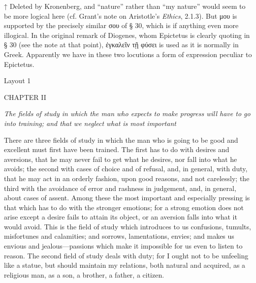 

↑ Deleted by Kronenberg, and ``nature'' rather than ``my nature'' would seem to be more logical here (cf. Grant's note on Aristotle's \emph{Ethics}, 2.1.3). But μου is supported by the precisely similar σου of § 30, which is if anything even more illogical. In the original remark of Diogenes, whom Epictetus is clearly quoting in § 30 (see the note at that point), ἐγκαλεῖν τῇ φύσει is used as it is normally in Greek. Apparently we have in these two locutions a form of expression peculiar to Epictetus.


Layout 1

CHAPTER II

\emph{The fields of study in which the man who expects to make progress will have to go into training; and that we neglect what is most important}

There are three fields of study in which the man who is going to be good and excellent must first have been trained. The first has to do with desires and aversions, that he may never fail to get what he desires, nor fall into what he avoids; the second with cases of choice and of refusal, and, in general, with duty, that he may act in an orderly fashion, upon good reasons, and not carelessly; the third with the avoidance of error and rashness in judgement, and, in general, about cases of assent. Among these the most important and especially pressing is that which has to do with the stronger emotions; for a strong emotion does not arise except a desire fails to attain its object, or an aversion falls into what it would avoid. This is the field of study which introduces to us confusions, tumults, misfortunes and calamities; and sorrows, lamentations, envies; and makes us envious and jealous—passions which make it impossible for us even to listen to reason. The second field of study deals with duty; for I ought not to be unfeeling like a statue, but should maintain my relations, both natural and acquired, as a religious man, as a son, a brother, a father, a citizen.

